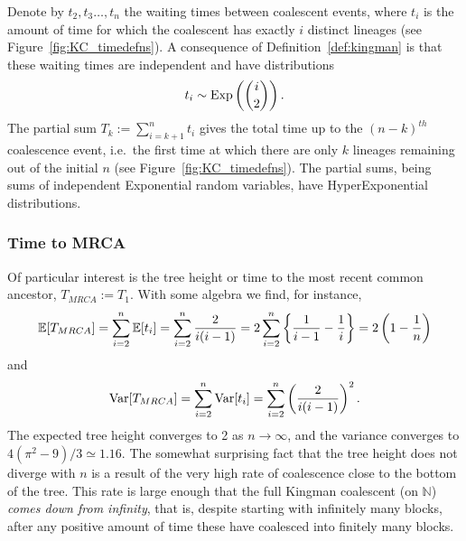 Denote by $t_2, t_3 \dots, t_n$ the waiting times between coalescent events, where $t_i$ is the amount of time for which the coalescent has exactly $i$ distinct lineages (see Figure~\ref{fig:KC_timedefns}).
A consequence of Definition~\ref{def:kingman} is that these waiting times are independent and have distributions
\begin{equation}
t_i \sim \operatorname{Exp}\left( \binom{i}{2} \right) .
\end{equation}
The partial sum $T_k := \sum_{i=k+1}^n t_i$ gives the total time up to the $(n-k)^{th}$ coalescence event, i.e.\ the first time at which there are only $k$ lineages remaining out of the initial $n$ (see Figure~\ref{fig:KC_timedefns}).
The partial sums, being sums of independent Exponential random variables, have HyperExponential distributions.


\subsubsection{Time to MRCA}
Of particular interest is the tree height or time to the most recent common ancestor, $T_{MRCA} := T_1$.
With some algebra we find, for instance,
\begin{equation}
\mathbb{E}[ T_{MRCA} ] 
= \sum_{i=2}^{n} \mathbb{E}[t_i]
= \sum_{i=2}^n \frac{2}{i(i-1)}
= 2 \sum_{i=2}^n \left\{ \frac{1}{i-1} - \frac{1}{i} \right\}
= 2 \left( 1 - \frac{1}{n} \right)
\end{equation}
and
\begin{equation}
\operatorname{Var}[ T_{MRCA} ] 
= \sum_{i=2}^n \operatorname{Var}[t_i]
= \sum_{i=2}^n \left( \frac{2}{i(i-1)} \right)^2 .
\end{equation}
The expected tree height converges to 2 as $n\to\infty$, and the variance converges to $4(\pi^2 - 9)/3 \simeq 1.16$.
The somewhat surprising fact that the tree height does not diverge with $n$ is a result of the very high rate of coalescence close to the bottom of the tree. This rate is large enough that the full Kingman coalescent (on $\mathbb{N}$) \emph{comes down from infinity}, that is, despite starting with infinitely many blocks, after any positive amount of time these have coalesced into finitely many blocks.


